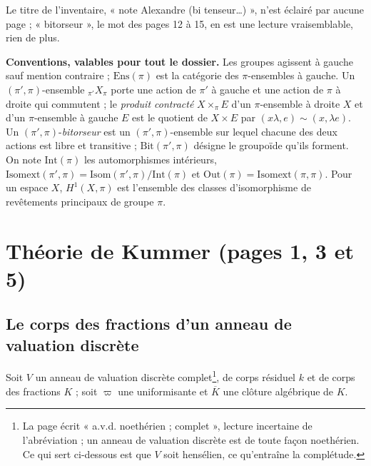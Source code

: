 \documentclass[11pt,a4paper]{article}
\begin{document}
Le titre de l'inventaire, « note Alexandre (bi tenseur…) », n'est éclairé par
aucune page ; « bitorseur », le mot des pages 12 à 15, en est une lecture
vraisemblable, rien de plus.

\textbf{Conventions, valables pour tout le dossier.} Les groupes agissent à
gauche sauf mention contraire ; $\mathrm{Ens}(\pi)$ est la catégorie des
$\pi$-ensembles à gauche. Un $(\pi', \pi)$-ensemble ${}_{\pi'}X_{\pi}$ porte une
action de $\pi'$ à gauche et une action de $\pi$ à droite qui commutent ; le
\emph{produit contracté} $X \times_{\pi} E$ d'un $\pi$-ensemble à droite $X$ et
d'un $\pi$-ensemble à gauche $E$ est le quotient de $X \times E$ par
$(x\lambda, e) \sim (x, \lambda e)$. Un $(\pi', \pi)$-\emph{bitorseur} est un
$(\pi', \pi)$-ensemble sur lequel chacune des deux actions est libre et
transitive ; $\mathrm{Bit}(\pi', \pi)$ désigne le groupoïde qu'ils forment. On
note $\mathrm{Int}(\pi)$ les automorphismes intérieurs,
$\mathrm{Isomext}(\pi', \pi) = \mathrm{Isom}(\pi', \pi)/\mathrm{Int}(\pi)$ et
$\mathrm{Out}(\pi) = \mathrm{Isomext}(\pi, \pi)$. Pour un espace $X$,
$H^1(X, \pi)$ est l'ensemble des classes d'isomorphisme de revêtements
principaux de groupe $\pi$.

\section*{Théorie de Kummer (pages 1, 3 et 5)}

\subsection*{Le corps des fractions d'un anneau de valuation discrète}

Soit $V$ un anneau de valuation discrète complet\footnote{La page écrit
« a.v.d. noethérien ; complet », lecture incertaine de l'abréviation ; un
anneau de valuation discrète est de toute façon noethérien. Ce qui sert
ci-dessous est que $V$ soit hensélien, ce qu'entraîne la complétude.}, de
corps résiduel $k$ et de corps des fractions $K$ ; soit $\varpi$ une
uniformisante et $\overline{K}$ une clôture algébrique de $K$.
\end{document}
